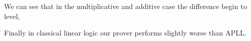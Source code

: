 \documentclass[a4paper, 12pt, tesi, english]{report}
\begin{document}
We can see that in the multiplicative and additive case the difference begin to level, 
\begin{figure}[h!]
\end{figure}
Finally in classical linear logic our prover performs slightly worse than APLL.




\end{document}
